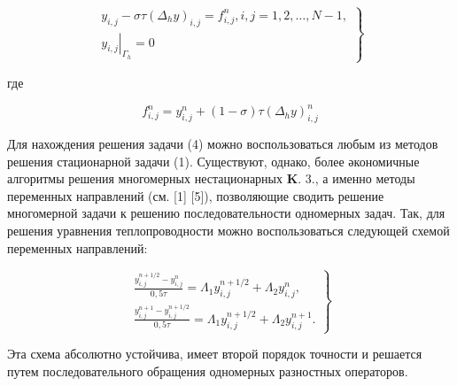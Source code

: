 \documentclass[10pt]{article}
\begin{document}
\[

\left.\begin{array}{l}

y_{i, j}-\sigma \tau\left(\Delta_{h} y\right)_{i, j}=f_{i, j}^{n}, i, j=1,2, \ldots, N-1, \\

\left.y_{i, j}\right|_{\Gamma_{h}}=0

\end{array}\right\}

\]



где



\[

f_{i, j}^{n}=y_{i, j}^{n}+(1-\sigma) \tau\left(\Delta_{h} y\right)_{i, j}^{n}

\]



Для нахождения решения задачи (4) можно воспользоваться любым из методов решения стационарной задачи (1). Существуют, однако, более әкономичные алгоритмы решения многомерных нестационарных $\mathbf{K}$. 3., а именно методы переменных направлений (см. [1] [5]), позволяющие сводить решение многомерной задачи к решению последовательности одномерных задач. Так, для решения уравнения теплопроводности можно воспользоваться следующей схемой переменных направлений:



\[

\left.\begin{array}{l}

\frac{y_{i, j}^{n+1 / 2}-y_{i, j}^{n}}{0,5 \tau}=\Lambda_{1} y_{i, j}^{n+1 / 2}+\Lambda_{2} y_{i, j}^{n}, \\

\frac{y_{i, j}^{n+1}-y_{i, j}^{n+1 / 2}}{0,5 \tau}=\Lambda_{1} y_{i, j}^{n+1 / 2}+\Lambda_{2} y_{i, j}^{n+1} .

\end{array}\right\}

\]



Эта схема абсолютно устойчива, имеет второй порядок точности и решается путем последовательного обращения одномерных разностных операторов.
\end{document}
